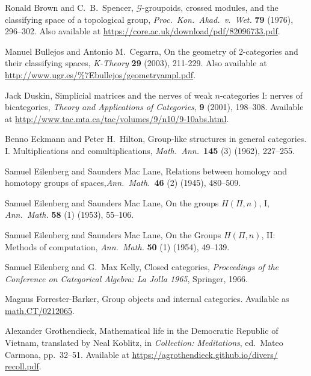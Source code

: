 \documentclass[reqno,12pt]{amsart}
\theoremstyle{definition}
\begin{document}
\begin{thebibliography}{99}
Ronald Brown and C.\ B.\ Spencer, $\mathcal{G}$-groupoids,
crossed modules, and the classifying space of a topological group,
\textsl{Proc.\ Kon.\ Akad.\ v.\ Wet.} \textbf{79} (1976), 296--302.
Also available at \href{https://core.ac.uk/download/pdf/82096733.pdf}{https://core.ac.uk/download/pdf/82096733.pdf}.

Manuel Bullejos and Antonio M.\ Cegarra,  On the geometry of 2-categories and  their classifying spaces, \textsl{K-Theory} \textbf{29} (2003), 211-229. 
Also available at \href{http://www.ugr.es/\%7Ebullejos/geometryampl.pdf}{http://www.ugr.es/\%7Ebullejos/geometryampl.pdf}.

Jack Duskin, Simplicial matrices and the nerves of weak $n$-categories I: nerves of bicategories, \textsl{Theory and Applications of Categories}, {\bf 9} (2001), 198--308.  Available at \href{http://www.tac.mta.ca/tac/volumes/9/n10/9-10abs.html}{http://www.tac.mta.ca/tac/volumes/9/n10/9-10abs.html}.

Benno Eckmann and Peter H.\ Hilton, Group-like structures in general categories. I. Multiplications and comultiplications, \textsl{Math.\ Ann.\ }\textbf{145} (3) (1962), 227--255.

Samuel Eilenberg and Saunders Mac Lane,  Relations between homology and homotopy groups of spaces,\textsl{Ann.\ Math.\ }\textbf{46} (2) (1945), 480--509.

Samuel Eilenberg and Saunders Mac Lane, On the groups $H(\Pi,n)$, I,
\textsl{Ann.\ Math. } \textbf{58} (1) (1953), 55--106.

Samuel Eilenberg and Saunders Mac Lane, On the Groups $H(\Pi,n)$, II: Methods of computation, \textsl{Ann.\ Math. } \textbf{50} (1) (1954), 49--139.

Samuel Eilenberg and G.\ Max Kelly, Closed categories, \textsl{Proceedings of the Conference on Categorical Algebra: La Jolla 1965}, Springer, 1966.

Magnus Forrester-Barker, Group objects and internal categories.  Available as \href{https://arxiv.org/abs/math.CT/0212065}{math.CT/0212065}.

Alexander Grothendieck, Mathematical life in the Democratic Republic of
Vietnam, translated by Neal Koblitz, in \textsl{Collection: Meditations}, ed.\
Mateo Carmona, pp.\ 32--51. Available at 
\href{https://agrothendieck.github.io/divers/recoll.pdf}{https://agrothendieck.github.io/divers/} \hfill \break \href{https://agrothendieck.github.io/divers/recoll.pdf}{recoll.pdf}. 


\end{thebibliography}
\end{document}
